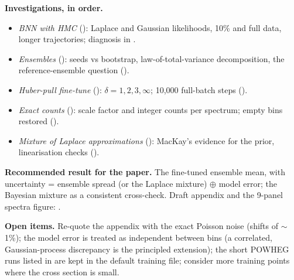 \noindent\textbf{Investigations, in order.}
\begin{itemize}[leftmargin=1.2em]
  \item \emph{BNN with HMC} (): Laplace and Gaussian likelihoods, 10\% and full
    data, longer trajectories; diagnosis in .
  \item \emph{Ensembles} (): seeds vs bootstrap, law-of-total-variance
    decomposition, the reference-ensemble question ().
  \item \emph{Huber-pull fine-tune} (): $\delta = 1, 2, 3, \infty$;
    10,000 full-batch steps ().
  \item \emph{Exact counts} (): scale factor and integer counts per
    spectrum; empty bins restored ().
  \item \emph{Mixture of Laplace approximations} (): MacKay's evidence for
    the prior, linearisation checks ().
\end{itemize}

\noindent\textbf{Recommended result for the paper.} The fine-tuned ensemble mean, with
uncertainty = ensemble spread (or the Laplace mixture) $\oplus$ model error; the Bayesian
mixture as a consistent cross-check. Draft appendix and the 9-panel spectra figure:
.

\noindent\textbf{Open items.} Re-quote the appendix with the exact Poisson noise (shifts of
$\sim$1\%); the model error is treated as independent between bins (a correlated,
Gaussian-process discrepancy is the principled extension); the short POWHEG runs listed in  are kept in the default training file;
consider more training points where the cross section is small.

